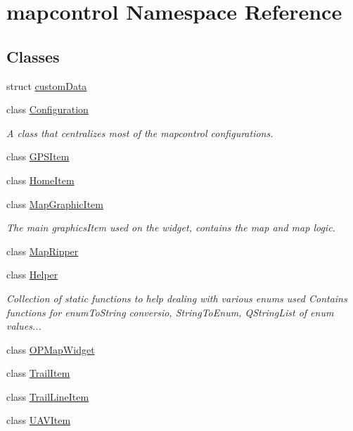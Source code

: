 \hypertarget{namespacemapcontrol}{\section{mapcontrol Namespace Reference}
\label{namespacemapcontrol}
}
\subsection*{Classes}
\begin{DoxyCompactItemize}
\item 
struct \hyperlink{structmapcontrol_1_1custom_data}{custom\-Data}
\item 
class \hyperlink{classmapcontrol_1_1_configuration}{Configuration}
\begin{DoxyCompactList}\small\item\em A class that centralizes most of the mapcontrol configurations. \end{DoxyCompactList}\item 
class \hyperlink{classmapcontrol_1_1_g_p_s_item}{G\-P\-S\-Item}
\item 
class \hyperlink{classmapcontrol_1_1_home_item}{Home\-Item}
\item 
class \hyperlink{classmapcontrol_1_1_map_graphic_item}{Map\-Graphic\-Item}
\begin{DoxyCompactList}\small\item\em The main graphics\-Item used on the widget, contains the map and map logic. \end{DoxyCompactList}\item 
class \hyperlink{classmapcontrol_1_1_map_ripper}{Map\-Ripper}
\item 
class \hyperlink{classmapcontrol_1_1_helper}{Helper}
\begin{DoxyCompactList}\small\item\em Collection of static functions to help dealing with various enums used Contains functions for enum\-To\-String conversio, String\-To\-Enum, Q\-String\-List of enum values... \end{DoxyCompactList}\item 
class \hyperlink{classmapcontrol_1_1_o_p_map_widget}{O\-P\-Map\-Widget}
\item 
class \hyperlink{classmapcontrol_1_1_trail_item}{Trail\-Item}
\item 
class \hyperlink{classmapcontrol_1_1_trail_line_item}{Trail\-Line\-Item}
\item 
class \hyperlink{classmapcontrol_1_1_u_a_v_item}{U\-A\-V\-Item}

\end{DoxyCompactItemize}
